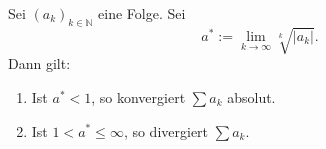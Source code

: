 Sei $(a_k)_{k \in \mathbb{N}}$ eine Folge. Sei 
$$a^* := \lim_{k \to \infty} \sqrt[k]{|a_k|}.$$
Dann gilt:
\begin{enumerate}[label=\alph*)]
    \item Ist $a^* < 1$, so konvergiert $\sum a_k$ absolut.
    \item Ist $1 < a^* \leq \infty$, so divergiert $\sum a_k$.
\end{enumerate}